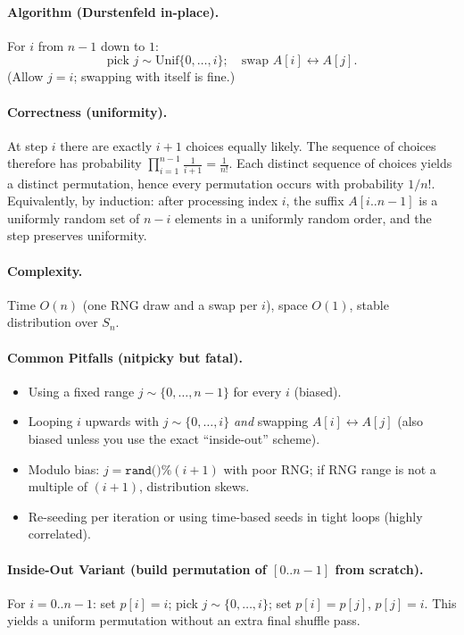 \documentclass[9pt]{extarticle}
\begin{document}
\paragraph{Algorithm (Durstenfeld in-place).}
For $i$ from $n-1$ down to $1$:
\[
\text{pick } j \sim \mathrm{Unif}\{0,\dots,i\};\quad \text{swap } A[i]\leftrightarrow A[j].
\]
(Allow $j=i$; swapping with itself is fine.)

\paragraph{Correctness (uniformity).}
At step $i$ there are exactly $i+1$ choices equally likely. The sequence of choices therefore has probability
\(
\prod_{i=1}^{n-1}\frac{1}{i+1}=\frac{1}{n!}.
\)
Each distinct sequence of choices yields a distinct permutation, hence every permutation occurs with probability $1/n!$. Equivalently, by induction: after processing index $i$, the suffix $A[i..n-1]$ is a uniformly random set of $n-i$ elements in a uniformly random order, and the step preserves uniformity.

\paragraph{Complexity.}
Time $O(n)$ (one RNG draw and a swap per $i$), space $O(1)$, stable distribution over $S_n$.

\paragraph{Common Pitfalls (nitpicky but fatal).}
\begin{itemize}
  \item Using a fixed range $j\sim \{0,\dots,n-1\}$ for every $i$ (biased).
  \item Looping $i$ upwards with $j\sim\{0,\dots,i\}$ \emph{and} swapping $A[i]\leftrightarrow A[j]$ (also biased unless you use the exact ``inside-out'' scheme).
  \item Modulo bias: $j=\texttt{rand()}\% (i+1)$ with poor RNG; if RNG range is not a multiple of $(i+1)$, distribution skews.
  \item Re-seeding per iteration or using time-based seeds in tight loops (highly correlated).
\end{itemize}

\paragraph{Inside-Out Variant (build permutation of \([0..n-1]\) from scratch).}
For $i=0..n-1$: set $p[i]=i$; pick $j\sim\{0,\dots,i\}$; set $p[i]=p[j]$, $p[j]=i$. This yields a uniform permutation without an extra final shuffle pass.
\end{document}

